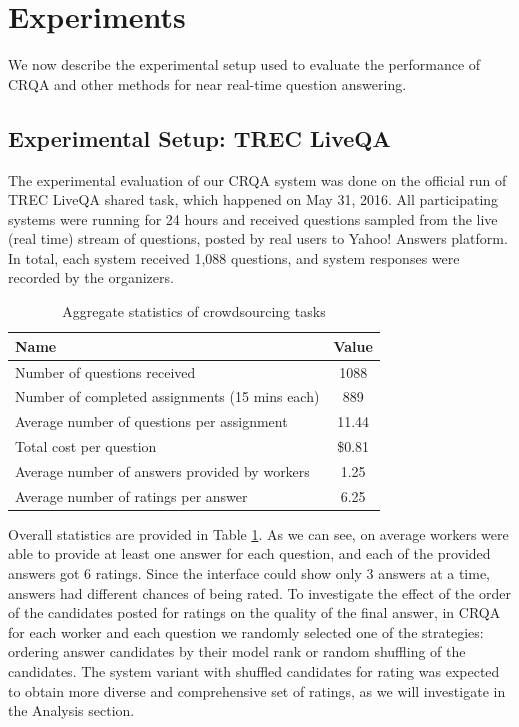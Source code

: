 \documentclass[letterpaper]{article}
\begin{document}
\section{Experiments}
\label{sec:experiments}

We now describe the experimental setup used to evaluate the performance of CRQA and other methods for near real-time question answering.

\subsection{Experimental Setup: TREC LiveQA}
The experimental evaluation of our CRQA system was done on the official run of TREC LiveQA shared task, which happened on May 31, 2016.
All participating systems were running for 24 hours and received questions sampled from the live (real time) stream of questions, posted by real users to Yahoo! Answers platform.
In total, each system received 1,088 questions, and system responses were recorded by the organizers.

\begin{table}[ht]
\centering
\begin{tabular}{| p{7cm} | c | }
\hline
Name & Value \\
\hline
Number of questions received & 1088 \\
Number of completed assignments (15 mins each) & 889 \\
Average number of questions per assignment & 11.44 \\
Total cost per question & \$0.81 \\
Average number of answers provided by workers & 1.25 \\
Average number of ratings per answer & 6.25 \\
\hline
\end{tabular}
\caption{Aggregate statistics of crowdsourcing tasks}
\label{table:task_stats}
\end{table}

Overall statistics are provided in Table \ref{table:task_stats}.
As we can see, on average workers were able to provide at least one answer for each question, and each of the provided answers got 6 ratings.
Since the interface could show only 3 answers at a time, answers had different chances of being rated.
To investigate the effect of the order of the candidates posted for ratings on the quality of the final answer, in CRQA for each worker and each question we randomly selected one of the strategies: ordering answer candidates by their model rank or random shuffling of the candidates.
The system variant with shuffled candidates for rating was expected to obtain more diverse and comprehensive set of ratings, as we will investigate in the Analysis section.
\end{document}
